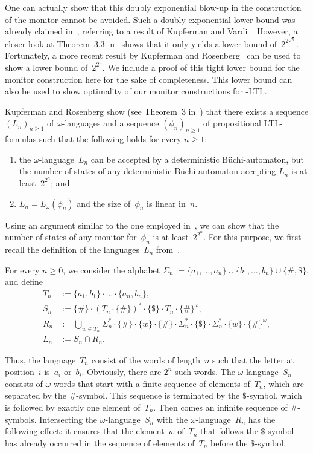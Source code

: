 One can actually show that this doubly exponential blow-up in the construction
of the monitor cannot be avoided.  Such a doubly exponential lower bound was
already claimed in~\cite{BaLS-ToSEM11}, referring to a result of Kupferman and
Vardi~\cite{KuVa-FMSD01}.  However, a closer look at Theorem~3.3
in~\cite{KuVa-FMSD01} shows that it only yields a lower bound
of~$2^{2^{\sqrt{n}}}$.  Fortunately, a more recent result by Kupferman and
Rosenberg~\cite{KuRo-MoChArt10} can be used to show a lower bound of~$2^{2^n}$.
We include a proof of this tight lower bound for the monitor construction here
for the sake of completeness.  This lower bound can also be used to show
optimality of our monitor constructions for \SHOQ-LTL\@.

Kupferman and Rosenberg show (see Theorem~3 in~\cite{KuRo-MoChArt10}) that there
exists a sequence $(L_n)_{n\ge 1}$ of $\omega$-languages and a sequence
$(\phi_n)_{n\ge 1}$ of propositional LTL-formulas such that the following holds
for every $n\ge 1$:
\begin{enumerate}
    \item the $\omega$-language~$L_n$ can be accepted by a deterministic
        Büchi-automaton, but the number of states of any deterministic
        Büchi-automaton accepting $L_n$ is at least~$2^{2^n}$; and
    \item $L_n=L_\omega(\phi_n)$ and the size of~$\phi_n$ is linear in~$n$.
\end{enumerate}

\noindent
Using an argument similar to the one employed in~\cite{KuRo-MoChArt10}, we can
show that the number of states of any monitor for~$\phi_n$ is at
least~$2^{2^n}$.  For this purpose, we first recall the definition of the
languages~$L_n$ from~\cite{KuRo-MoChArt10}.

For every $n\ge 0$, we consider the alphabet
$\Sigma_n:=\{a_1,\dots,a_n\}\cup\{b_1,\dots,b_n\}\cup\{\#,\$\}$, and define
\begin{align*}
    T_n &:=\{a_1,b_1\}\cdot\dotso\cdot\{a_n,b_n\},\\[1ex]
    S_n &:=\{\#\}\cdot(T_n\cdot\{\#\})^*\cdot\{\$\}\cdot T_n\cdot\{\#\}^\omega,\\[1ex]
    R_n &:=\bigcup_{w\in T_n}\Sigma_n^*\cdot\{\#\}\cdot\{w\}\cdot\{\#\}\cdot\Sigma_n^*\cdot\{\$\}\cdot\Sigma_n^*\cdot\{w\}\cdot\{\#\}^\omega,\\
    L_n &:=S_n\cap R_n.
\end{align*}

\noindent
Thus, the language~$T_n$ consist of the words of length~$n$ such that the letter
at position~$i$ is~$a_i$ or~$b_i$.  Obviously, there are $2^n$ such words.
%
The $\omega$-language~$S_n$ consists of $\omega$-words that start with a finite
sequence of elements of~$T_n$, which are separated by the $\#$-symbol.  This
sequence is terminated by the $\$$-symbol, which is followed by exactly one
element of~$T_n$.  Then comes an infinite sequence of $\#$-symbols.
%
Intersecting the $\omega$-language~$S_n$ with the $\omega$-language~$R_n$ has
the following effect: it ensures that the element~$w$ of~$T_n$ that follows the
$\$$-symbol has already occurred in the sequence of elements of~$T_n$ before the
$\$$-symbol.

